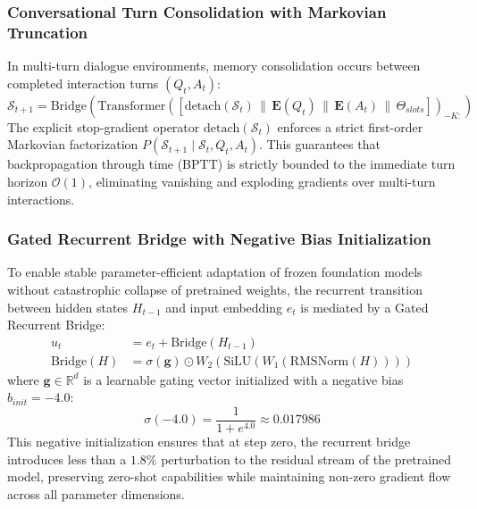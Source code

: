 \documentclass[11pt,a4paper]{article}
\begin{document}
\subsubsection{Conversational Turn Consolidation with Markovian Truncation}
In multi-turn dialogue environments, memory consolidation occurs between completed interaction turns $(Q_t, A_t)$:
\begin{equation}
\mathcal{S}_{t+1} = \text{Bridge}\left( \text{Transformer}\left( \left[ \text{detach}(\mathcal{S}_t) \,\|\, \mathbf{E}(Q_t) \,\|\, \mathbf{E}(A_t) \,\|\, \Theta_{slots} \right] \right)_{-K:} \right)
\end{equation}
The explicit stop-gradient operator $\text{detach}(\mathcal{S}_t)$ enforces a strict first-order Markovian factorization $P(\mathcal{S}_{t+1} \mid \mathcal{S}_t, Q_t, A_t)$. This guarantees that backpropagation through time (BPTT) is strictly bounded to the immediate turn horizon $\mathcal{O}(1)$, eliminating vanishing and exploding gradients over multi-turn interactions.

\subsubsection{Gated Recurrent Bridge with Negative Bias Initialization}
To enable stable parameter-efficient adaptation of frozen foundation models without catastrophic collapse of pretrained weights, the recurrent transition between hidden states $H_{t-1}$ and input embedding $e_t$ is mediated by a Gated Recurrent Bridge:
\begin{align}
u_t &= e_t + \text{Bridge}(H_{t-1}) \\
\text{Bridge}(H) &= \sigma(\mathbf{g}) \odot W_2 \left( \text{SiLU}(W_1(\text{RMSNorm}(H))) \right)
\end{align}
where $\mathbf{g} \in \mathbb{R}^d$ is a learnable gating vector initialized with a negative bias $b_{init} = -4.0$:
\begin{equation}
\sigma(-4.0) = \frac{1}{1 + e^{4.0}} \approx 0.017986
\end{equation}
This negative initialization ensures that at step zero, the recurrent bridge introduces less than a $1.8\%$ perturbation to the residual stream of the pretrained model, preserving zero-shot capabilities while maintaining non-zero gradient flow across all parameter dimensions.
\end{document}
